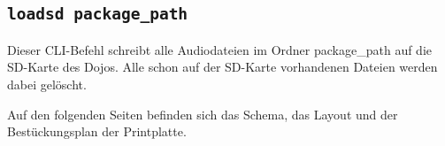 \subsection{\texttt{loadsd package\_path}}
Dieser CLI-Befehl schreibt alle Audiodateien im Ordner package\_path auf die SD-Karte des Dojos. Alle schon auf der SD-Karte vorhandenen Dateien werden dabei gelöscht.

\newpage
Auf den folgenden Seiten befinden sich das Schema, das Layout und der Bestückungsplan der Printplatte.


\label{pdf:SchemaSpannungsversorgung}


\label{pdf:SchemaUSB}


\label{pdf:SchemaMikrocontroller}


\label{pdf:BestueckungTop}


\label{pdf:BestueckungBottom}


\label{pdf:LayoutAll}


\label{pdf:LayoutTop}


\label{pdf:LayoutBottom}
